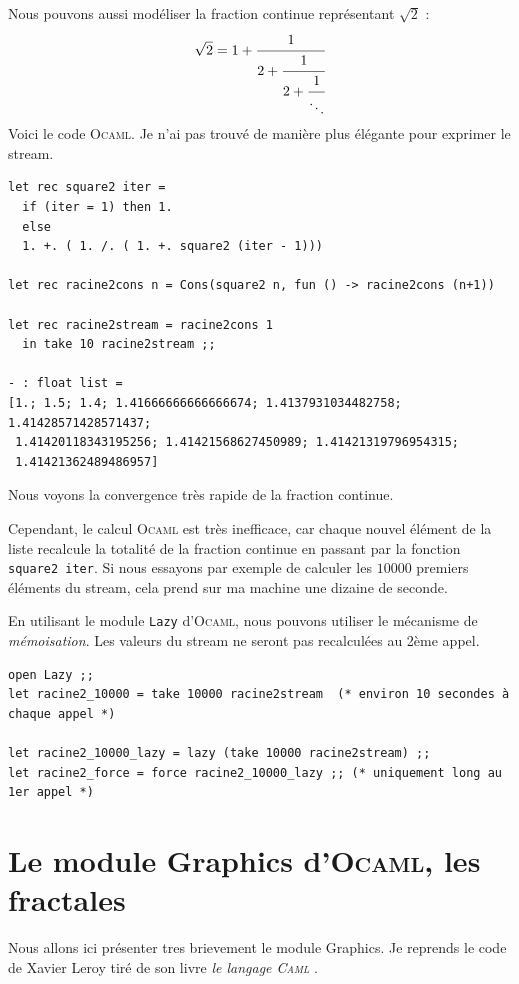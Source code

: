 Nous pouvons aussi modéliser la fraction continue représentant $\sqrt{2}$ :
\begin{equation*}
\sqrt{2} = 1 + \cfrac{1}{2
+ \cfrac{1}{2
+ \cfrac{1}{\ddots
 } } }
\end{equation*}
Voici le code \textsc{Ocaml}. Je n'ai pas trouvé de manière plus élégante pour exprimer le stream.
\begin{verbatim}
let rec square2 iter =
  if (iter = 1) then 1.
  else
  1. +. ( 1. /. ( 1. +. square2 (iter - 1)))

let rec racine2cons n = Cons(square2 n, fun () -> racine2cons (n+1))

let rec racine2stream = racine2cons 1
  in take 10 racine2stream ;;

- : float list =
[1.; 1.5; 1.4; 1.41666666666666674; 1.4137931034482758; 1.41428571428571437;
 1.41420118343195256; 1.41421568627450989; 1.41421319796954315;
 1.41421362489486957]
\end{verbatim}
Nous voyons la convergence très rapide de la fraction continue.

Cependant, le calcul \textsc{Ocaml} est très inefficace, car chaque nouvel élément de la liste recalcule la totalité de la fraction continue
en passant par la fonction \texttt{square2 iter}. Si nous essayons par exemple de calculer les $10000$ premiers éléments du stream, cela prend sur ma machine une
dizaine de seconde. 

En utilisant le module \texttt{Lazy} d'\textsc{Ocaml}, nous pouvons utiliser le mécanisme
 de \textit{mémoisation}. Les valeurs du stream ne seront pas recalculées au 
2ème appel.
\begin{verbatim}
open Lazy ;;
let racine2_10000 = take 10000 racine2stream  (* environ 10 secondes à chaque appel *)

let racine2_10000_lazy = lazy (take 10000 racine2stream) ;;
let racine2_force = force racine2_10000_lazy ;; (* uniquement long au 1er appel *)
\end{verbatim} 



\section{Le module Graphics d'\textsc{Ocaml}, les fractales}

Nous allons ici présenter tres brievement le module Graphics.
Je reprends le code de Xavier Leroy tiré de son livre \textit{le langage \textsc{Caml}} \cite{caml}.

